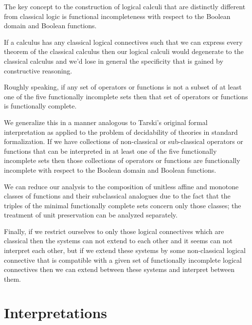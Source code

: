 \begin{center}
	\begin{flushleft}
		The key concept to the construction of logical calculi that are distinctly different from classical logic is functional incompleteness with respect to the Boolean domain and Boolean functions.
	\end{flushleft}
	\begin{flushleft}
		If a calculus has any classical logical connectives such that we can express every theorem of the classical calculus then our logical calculi would degenerate to the classical calculus and we'd lose in general the specificity that is gained by constructive reasoning.
	\end{flushleft}
	\begin{flushleft}
		Roughly speaking, if any set of operators or functions is not a subset of at least one of the five functionally incomplete sets then that set of operators or functions is functionally complete.
	\end{flushleft}
	\begin{flushleft}
		We generalize this in a manner analogous to Tarski's original formal interpretation as applied to the problem of decidability of theories in standard formalization. If we have collections of non-classical or sub-classical operators or functions that can be interpreted in at least one of the five functionally incomplete sets then those collections of operators or functions are functionally incomplete with respect to the Boolean domain and Boolean functions.
	\end{flushleft}
	\begin{flushleft}
	We can reduce our analysis to the composition of unitless affine and monotone classes of functions and their subclassical analogues due to the fact that the triples of the minimal functionally complete sets concern only those classes; the treatment of unit preservation can be analyzed separately.
	\end{flushleft}
	\begin{flushleft}
		Finally, if we restrict ourselves to only those logical connectives which are classical then the systems can not extend to each other and it seems can not interpret each other, but if we extend these systems by some non-classical logical connective that is compatible with a given set of functionally incomplete logical connectives then we can extend between these systems and interpret between them.
	\end{flushleft}
	\section{Interpretations}

\end{center}
